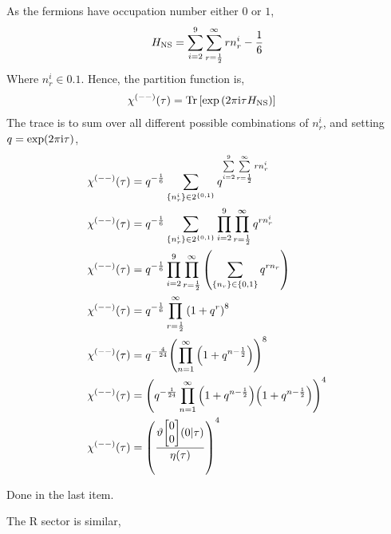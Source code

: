 \problem{}
\probitem{}

As the fermions have occupation number either $0$ or $1$, \[H_{\textnormal{NS}}=\sum\limits_{i=2}^9\sum\limits_{r=\frac12}^\infty rn_{r}^i-\frac16\] 
Where $n_r^i\in\qty{0,1}$. Hence, the partition function is,
\begin{align*}
    \chi^{(--)}\qty(\tau)&=\Tr\qty[\exp\qty(2\pi\textnormal{i}\tau H_{\textnormal{NS}})]
\end{align*}
The trace is to sum over all different possible combinations of $n_r^i$, and setting $q=\exp(2\pi\textnormal{i}\tau)$,
\begin{align*}
    \chi^{(--)}\qty(\tau)&=q^{-\frac16}\sum\limits_{\qty{n_r^i}\in 2^{\qty{0,1}}}q^{\sum\limits_{i=2}^9\sum\limits_{r=\frac12}^\infty rn_r^i} \\
    \chi^{(--)}\qty(\tau)&=q^{-\frac16}\sum\limits_{\qty{n_r^i}\in 2^{\qty{0,1}}}\prod\limits_{i=2}^9\prod\limits_{r=\frac12}^\infty q^{ rn_r^i} \\
    \chi^{(--)}\qty(\tau)&=q^{-\frac16}\prod\limits_{i=2}^9\prod\limits_{r=\frac12}^\infty\qty(\sum\limits_{\qty{n_r}\in\qty{0,1}} q^{ rn_r} )\\
    \chi^{(--)}\qty(\tau)&=q^{-\frac16}\prod\limits_{r=\frac12}^\infty\qty(1+q^r )^8\\
    \chi^{(--)}\qty(\tau)&=q^{-\frac{4}{24}}\qty(\prod\limits_{n=1}^\infty\qty(1+q^{n-\frac12} ))^8\\
    \chi^{(--)}\qty(\tau)&=\qty(q^{-\frac{1}{24}}\prod\limits_{n=1}^\infty\qty(1+q^{n-\frac12} )\qty(1+q^{n-\frac12} ))^4\\
    \chi^{(--)}\qty(\tau)&=\qty(\frac{\vartheta\mqty[0\\0]\qty(0|\tau)}{\eta\qty(\tau)})^4
\end{align*}

\probitem{}

Done in the last item.

\probitem{}

The R sector is similar,

